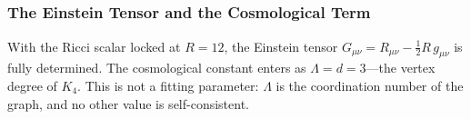 \documentclass[11pt,a4paper]{book}
\begin{document}
\begin{code}
\<%
\\
\>[0]\AgdaSpace{}%
\AgdaSpace{}%
\AgdaSymbol{=}%
\>[8726I]\AgdaSpace{}%
\AgdaSpace{}%
\AgdaSpace{}%
\AgdaSpace{}%
\<%
\\
\>[.][@{}l@{}]\<[8726I]%
\>[24]\AgdaSpace{}%
\AgdaSpace{}%
\AgdaSpace{}%
\AgdaSpace{}%
\<%
\\
%
\>[24]\AgdaSpace{}%
\AgdaSpace{}%
\AgdaSpace{}%
\<%
\\
%
\\[\AgdaEmptyExtraSkip]%
\>[0]\<%
\\
\>[0][@{}l@{\AgdaIndent{0}}]%
\>[2]\AgdaSpace{}%
\<%
\\
%
\\[\AgdaEmptyExtraSkip]%
%
\>[2]\AgdaSpace{}%
\AgdaSymbol{:}\AgdaSpace{}%
\AgdaSymbol{(}\AgdaSpace{}%
\AgdaSymbol{:}\AgdaSpace{}%
\AgdaSymbol{)}\AgdaSpace{}%
\AgdaSpace{}%
\AgdaSpace{}%
\AgdaSpace{}%
\AgdaSpace{}%
\AgdaSpace{}%
\<%
\\
%
\>[2]\AgdaSpace{}%
\AgdaSpace{}%
\AgdaSymbol{=}\AgdaSpace{}%
\<%
\end{code}

\subsubsection*{The Einstein Tensor and the Cosmological Term}

With the Ricci scalar locked at $R = 12$, the Einstein tensor
$G_{\mu\nu} = R_{\mu\nu} - \tfrac{1}{2}R\,g_{\mu\nu}$ is fully
determined. The cosmological constant enters as $\Lambda = d = 3$---the
vertex degree of $K_4$. This is not a fitting parameter: $\Lambda$ is
the coordination number of the graph, and no other value is
self-consistent.
\end{document}
